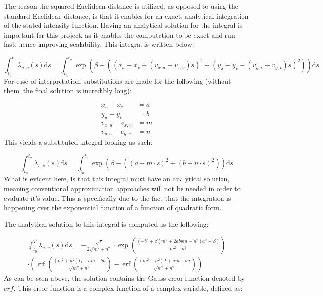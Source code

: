 The reason the squared Euclidean distance is utilized, as opposed to using the standard Euclidean distance, is that it enables for an exact, analytical integration of the stated intensity function.
Having an analytical solution for the integral is important for this project, as it enables the computation to be exact and run fast, hence improving scalability.
This integral is written below:

\begin{equation}
    \int_{t_0}^{t_{n}} \lambda_{u,v}(s) \mathrm{d}s 
    =
    \int_{t_0}^{t_n} \exp \left(\beta - \left((x_u - x_v + (v_{x,u} - v_{x,v})s)^2 + (y_u - y_v + ( v_{y,u} - v_{y,v})s)^2\right)\right) \mathrm{d}s
\end{equation}
For ease of interpretation, substitutions are made for the following (without them, the final solution is incredibly long):

\begin{align}
    x_u - x_v &= a
    \\
    y_u - y_v &= b
    \\
    v_{x,u} - v_{x,v} &= m
    \\
    v_{y,u} - v_{y,v} &= n
\end{align}
This yields a substituted integral looking as such:

\begin{equation}
    \int_{t_0}^{t_n} \lambda_{u,v}(s) \mathrm{d}s 
    =
    \int_{t_0}^{t_n} \exp \left(\beta - \left((a + m \cdot s)^2 + (b + n \cdot s)^2\right)\right) \mathrm{d}s
\end{equation}
What is evident here, is that this integral must have an analytical solution, meaning conventional approximation approaches will not be needed in order to evaluate it's value. 
This is specifically due to the fact that the integration is happening over the exponential function of a function of quadratic form.

The analytical solution to this integral is computed as the following:

\begin{align}
    \int_{t_0}^T \lambda_{u,v}(s) \mathrm{d}s
    = 
    -\frac{\sqrt{\pi}}{2 \sqrt{m^{2}+n^{2}}}
    \cdot
    \exp\left(\frac{\left(-b^{2}+\beta\right) m^{2}+2abmn-n^{2}(a^{2}-\beta)}{m^{2}+n^{2}}\right)
    \\
    \cdot 
    \left(
    \operatorname{erf}\left(\frac{\left(m^{2}+n^{2}\right)t_{0}+am+b n}{\sqrt{m^{2}+n^{2}}}\right)
    -\operatorname{erf}\left(\frac{\left(m^{2}+n^{2}\right)T+am+b n}{\sqrt{m^{2}+n^{2}}}\right)
    \right)
    \label{eq:analytical_integral}
\end{align}
As can be seen above, the solution contains the Gauss error function denoted by $erf$.
This error function is a complex function of a complex variable, defined as:

